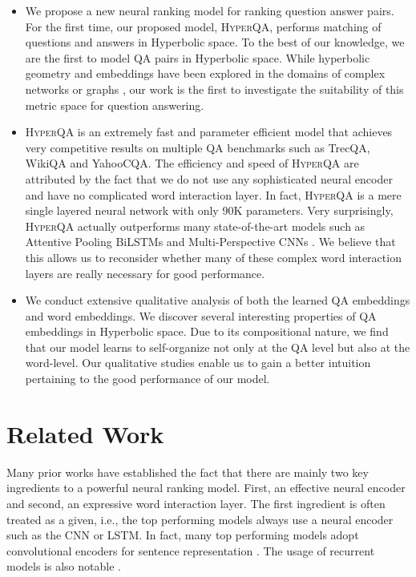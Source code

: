 \documentclass[sigconf]{acmart}
\begin{document}
\begin{itemize}

\item We propose a new neural ranking model for ranking question answer pairs. For the first time, our proposed model, \textsc{HyperQA}, performs matching of questions and answers in Hyperbolic space. To the best of our knowledge, we are the first to model QA pairs in Hyperbolic space. While hyperbolic geometry and embeddings have been explored in the domains of complex networks or graphs \cite{DBLP:journals/corr/abs-1006-5169}, our work is the first to investigate the suitability of this metric space for question answering. 
\item \textsc{HyperQA} is an extremely fast and parameter efficient model that achieves very competitive results on multiple QA benchmarks such as TrecQA, WikiQA and YahooCQA. The efficiency and speed of \textsc{HyperQA} are attributed by the fact that we do not use any sophisticated neural encoder and have no complicated word interaction layer. In fact, \textsc{HyperQA} is a mere single layered neural network with only 90K parameters. Very surprisingly, \textsc{HyperQA} actually outperforms many state-of-the-art models such as Attentive Pooling BiLSTMs \cite{DBLP:journals/corr/SantosTXZ16,DBLP:conf/aaai/ZhangLSW17} and Multi-Perspective CNNs \cite{DBLP:conf/naacl/HeL16}. We believe that this allows us to reconsider whether many of these complex word interaction layers are really necessary for good performance. 
\item We conduct extensive qualitative analysis of both the learned QA embeddings and word embeddings. We discover several interesting properties of QA embeddings in Hyperbolic space. Due to its compositional nature, we find that our model learns to self-organize not only at the QA level but also at the word-level. Our qualitative studies enable us to gain a better intuition pertaining to the good performance of our model. 

\end{itemize}




\section{Related Work}


Many prior works have established the fact that there are mainly two key ingredients to a powerful neural ranking model. First, an effective neural encoder and second, an expressive word interaction layer. The first ingredient is often treated as a given, i.e., the top performing models always use a neural encoder such as the CNN or LSTM. In fact, many top performing models adopt convolutional encoders for sentence representation \cite{DBLP:conf/emnlp/HeGL15,DBLP:conf/ijcai/QiuH15,DBLP:conf/sigir/SeverynM15,DBLP:conf/naacl/HeL16,DBLP:conf/aaai/ZhangLSW17,shen2014latent}. The usage of recurrent models is also notable \cite{DBLP:conf/aaai/MuellerT16,DBLP:conf/sigir/SeverynM15,DBLP:conf/sigir/TayPLH17,1711.07656}.
\end{document}
